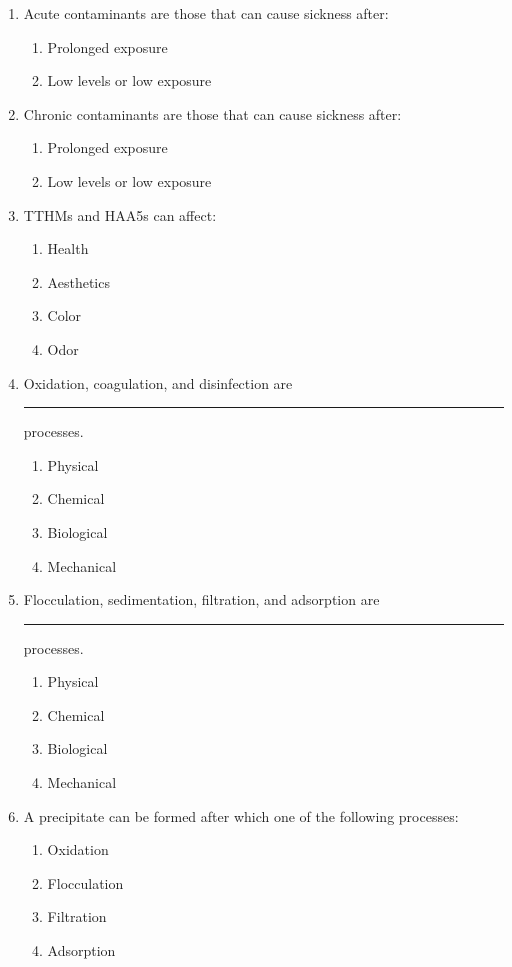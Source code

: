 \begin{enumerate}
\item Acute contaminants are those that can cause sickness after:
\begin{enumerate}
\item Prolonged exposure
\item Low levels or low exposure
\end{enumerate}

\item Chronic contaminants are those that can cause sickness after:
\begin{enumerate}
\item Prolonged exposure
\item Low levels or low exposure
\end{enumerate}

\item TTHMs and HAA5s can affect:
\begin{enumerate}
\item Health
\item Aesthetics
\item Color
\item Odor
\end{enumerate}

\item Oxidation, coagulation, and disinfection are \rule{1cm}{0.5pt}  processes.
\begin{enumerate}
\item Physical
\item Chemical
\item Biological
\item Mechanical
\end{enumerate}

\item Flocculation, sedimentation, filtration, and adsorption are \rule{1cm}{0.5pt} processes.
\begin{enumerate}
\item Physical
\item Chemical
\item Biological
\item Mechanical
\end{enumerate}

\item A precipitate can be formed after which one of the following processes:
\begin{enumerate}
\item Oxidation
\item Flocculation
\item Filtration
\item Adsorption
\end{enumerate}


\end{enumerate}
